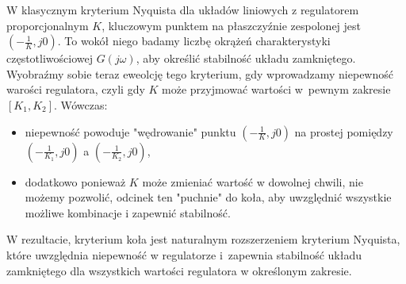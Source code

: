 \documentclass{article}
\begin{document}
    \begin{tcolorbox}[colback=pink!5, colframe=pink!75!black, title=Intuicja]
        W klasycznym kryterium Nyquista dla układów liniowych z regulatorem
        proporcjonalnym $K$, kluczowym punktem na płaszczyźnie zespolonej jest
        $(-\frac{1}{K},j0)$. To wokół niego badamy liczbę okrążeń charakterystyki
        częstotliwościowej $G(j\omega)$, aby określić stabilność układu
        zamkniętego.
        Wyobraźmy sobie teraz eweolcję tego kryterium, gdy wprowadzamy
        niepewność warości regulatora, czyli gdy $K$ może przyjmować wartości
        w~pewnym zakresie $[K_1, K_2]$. Wówczas:
        \begin{itemize}
            \item niepewność powoduje "wędrowanie" punktu $(-\frac{1}{K},j0)$
            na prostej pomiędzy $(-\frac{1}{K_1},j0)$ a $(-\frac{1}{K_2},j0)$,
            \item dodatkowo ponieważ $K$ może zmieniać wartość w dowolnej
            chwili, nie możemy pozwolić, odcinek ten "puchnie" do koła,
            aby uwzględnić wszystkie możliwe kombinacje i zapewnić stabilność.
        \end{itemize}

        W rezultacie, kryterium koła jest naturalnym rozszerzeniem kryterium
        Nyquista, które uwzględnia niepewność w regulatorze i~zapewnia
        stabilność
        układu zamkniętego dla wszystkich wartości regulatora w określonym
        zakresie.
    \end{tcolorbox}
    

    


\end{document}
